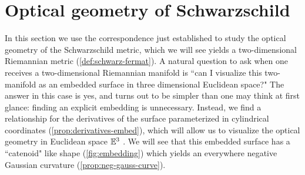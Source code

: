 %
%

\section{Optical geometry of Schwarzschild}
In this section we use the correspondence just established to study the optical geometry of the Schwarzschild metric, which we will see yields a two-dimensional Riemannian metric (\cref{def:schwarz-fermat}).
A natural question to ask when one receives a two-dimensional Riemannian manifold is ``can I visualize this two-manifold as an embedded surface in three dimensional Euclidean space?"
The answer in this case is yes, and turns out to be simpler than one may think at first glance: finding an explicit embedding is unnecessary.
Instead, we find a relationship for the derivatives of the surface parameterized in cylindrical coordinates (\cref{prop:derivatives-embed}), which will allow us to visualize the optical geometry in Euclidean space $\mathbb{E}^3$ .
We will see that this embedded surface has a ``catenoid" like shape (\cref{fig:embedding}) which yields an everywhere negative Gaussian curvature (\cref{prop:neg-gauss-curve}).

